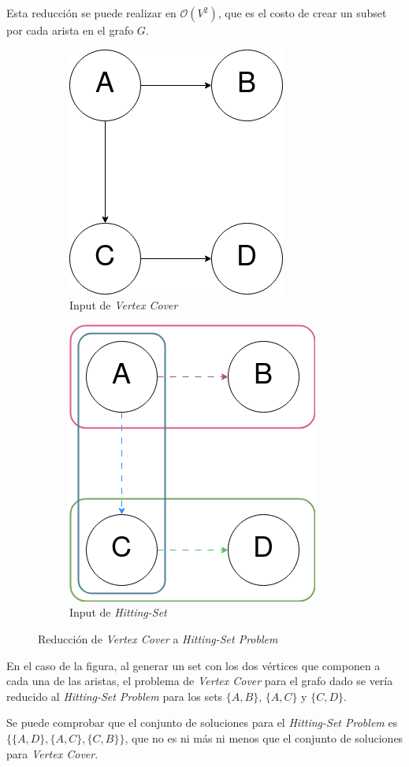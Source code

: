 

Esta reducción se puede realizar en $\mathcal{O}(V^2)$, que es el costo de
crear un subset por cada arista en el grafo $G$.

\begin{figure}[h]
    \centering
    \begin{subfigure}{0.4\textwidth}
        \centering
        \includegraphics[width=0.585\linewidth]{img/vertex-cover.png}
        \caption{Input de \textit{Vertex Cover}}
    \end{subfigure}
    \begin{subfigure}{0.4\textwidth}
        \centering
        \includegraphics[width=0.6\linewidth]{img/hitting-set.png}
        \caption{Input de \textit{Hitting-Set}}
    \end{subfigure}
    \caption{Reducción de \textit{Vertex Cover} a \textit{Hitting-Set Problem}}
\end{figure}

En el caso de la figura, al generar un set con los dos vértices que componen a
cada una de las aristas, el problema de \textit{Vertex Cover} para el grafo dado
se vería reducido al \textit{Hitting-Set Problem} para los sets $\{A,B\}$,
$\{A,C\}$ y $\{C,D\}$.

Se puede comprobar que el conjunto de soluciones para el \textit{Hitting-Set Problem}
es $\{\{A,D\},\{A,C\},\{C,B\}\}$, que no es ni más ni menos que el conjunto de
soluciones para \textit{Vertex Cover}.